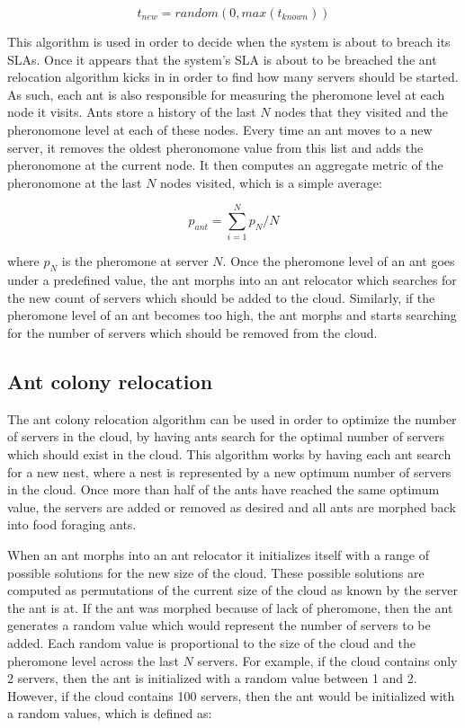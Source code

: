 \documentclass{sig-alternate}
\begin{document}
\begin{equation}
t_{new} = random(0, max(t_{known}))
\label{eq:randomnew}
\end{equation}

This algorithm is used in order to decide when the system is about to breach its SLAs. Once it appears that the system's SLA is about to be breached the ant relocation algorithm kicks in in order to find how many servers should be started. As such, each ant is also responsible for measuring the pheromone level at each node it visits. Ants store a history of the last $N$ nodes that they visited and the pheronomone level at each of these nodes. Every time an ant moves to a new server, it removes the oldest pheronomone value from this list and adds the pheronomone at the current node. It then computes an aggregate metric of the pheronomone at the last $N$ nodes visited, which is a simple average:

\begin{equation}
p_{ant} = \sum_{i=1}^{N} p_{N} / N
\end{equation}

where $p_{N}$ is the pheromone at server $N$. Once the pheromone level of an ant goes under a predefined value, the ant morphs into an ant relocator which searches for the new count of servers which should be added to the cloud. Similarly, if the pheromone level of an ant becomes too high, the ant morphs and starts searching for the number of servers which should be removed from the cloud.

\subsection{Ant colony relocation}

The ant colony relocation algorithm can be used in order to optimize the number of servers in the cloud, by having ants search for the optimal number of servers which should exist in the cloud. This algorithm works by having each ant search for a new nest, where a nest is represented by a new optimum number of servers in the cloud. Once more than half of the ants have reached the same optimum value, the servers are added or removed as desired and all ants are morphed back into food foraging ants.

When an ant morphs into an ant relocator it initializes itself with a range of possible solutions for the new size of the cloud. These possible solutions are computed as permutations of the current size of the cloud as known by the server the ant is at. If the ant was morphed because of lack of pheromone, then the ant generates a random value which would represent the number of servers to be added. Each random value is proportional to the size of the cloud and the pheromone level across the last $N$ servers. For example, if the cloud contains only 2 servers, then the ant is initialized with a random value between 1 and 2. However, if the cloud contains 100 servers, then the ant would be initialized with a random values, which is defined as:
\end{document}

